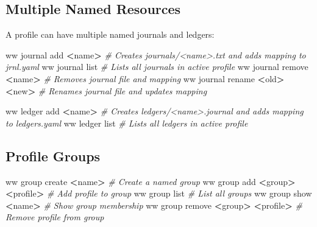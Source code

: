 \documentclass[
]{article}
\newenvironment{Shaded}{\begin{snugshade}}{\end{snugshade}}
\newcommand{\CommentTok}[1]{\textcolor[rgb]{0.56,0.35,0.01}{\textit{#1}}}
\newcommand{\ExtensionTok}[1]{#1}
\newcommand{\NormalTok}[1]{#1}
\newcommand{\OperatorTok}[1]{\textcolor[rgb]{0.81,0.36,0.00}{\textbf{#1}}}
\begin{document}
\subsection{Multiple Named Resources}\label{multiple-named-resources}

A profile can have multiple named journals and ledgers:

\begin{Shaded}
\begin{Highlighting}[]
\ExtensionTok{ww}\NormalTok{ journal add }\OperatorTok{\textless{}}\NormalTok{name}\OperatorTok{\textgreater{}}          \CommentTok{\# Creates journals/\textless{}name\textgreater{}.txt and adds mapping to jrnl.yaml}
\ExtensionTok{ww}\NormalTok{ journal list                }\CommentTok{\# Lists all journals in active profile}
\ExtensionTok{ww}\NormalTok{ journal remove }\OperatorTok{\textless{}}\NormalTok{name}\OperatorTok{\textgreater{}}       \CommentTok{\# Removes journal file and mapping}
\ExtensionTok{ww}\NormalTok{ journal rename }\OperatorTok{\textless{}}\NormalTok{old}\OperatorTok{\textgreater{}} \OperatorTok{\textless{}}\NormalTok{new}\OperatorTok{\textgreater{}}  \CommentTok{\# Renames journal file and updates mapping}

\ExtensionTok{ww}\NormalTok{ ledger add }\OperatorTok{\textless{}}\NormalTok{name}\OperatorTok{\textgreater{}}           \CommentTok{\# Creates ledgers/\textless{}name\textgreater{}.journal and adds mapping to ledgers.yaml}
\ExtensionTok{ww}\NormalTok{ ledger list                 }\CommentTok{\# Lists all ledgers in active profile}
\end{Highlighting}
\end{Shaded}

\subsection{Profile Groups}\label{profile-groups}

\begin{Shaded}
\begin{Highlighting}[]
\ExtensionTok{ww}\NormalTok{ group create }\OperatorTok{\textless{}}\NormalTok{name}\OperatorTok{\textgreater{}}                    \CommentTok{\# Create a named group}
\ExtensionTok{ww}\NormalTok{ group add }\OperatorTok{\textless{}}\NormalTok{group}\OperatorTok{\textgreater{}} \OperatorTok{\textless{}}\NormalTok{profile}\OperatorTok{\textgreater{}}            \CommentTok{\# Add profile to group}
\ExtensionTok{ww}\NormalTok{ group list                             }\CommentTok{\# List all groups}
\ExtensionTok{ww}\NormalTok{ group show }\OperatorTok{\textless{}}\NormalTok{name}\OperatorTok{\textgreater{}}                      \CommentTok{\# Show group membership}
\ExtensionTok{ww}\NormalTok{ group remove }\OperatorTok{\textless{}}\NormalTok{group}\OperatorTok{\textgreater{}} \OperatorTok{\textless{}}\NormalTok{profile}\OperatorTok{\textgreater{}}         \CommentTok{\# Remove profile from group}
\end{Highlighting}
\end{Shaded}
\end{document}
